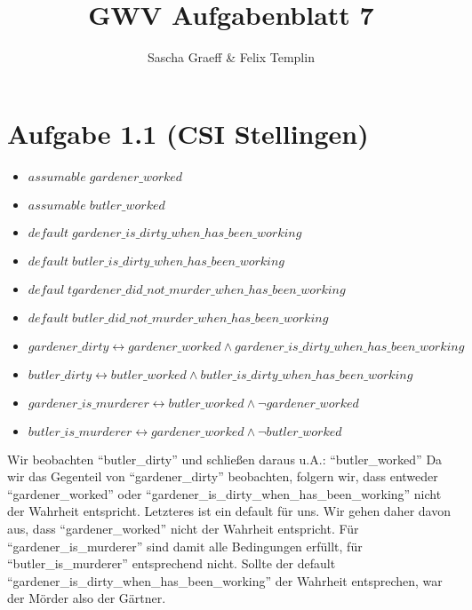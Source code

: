 \documentclass[a4paper,10pt]{article}
\title{GWV Aufgabenblatt 7}
\author{Sascha Graeff \& Felix Templin}
\begin{document}
\maketitle

\section*{Aufgabe 1.1 (CSI Stellingen)}
\begin{itemize}
  \item $assumable \; gardener\_worked$
  \item $assumable \; butler\_worked$
  \item $default \; gardener\_is\_dirty\_when\_has\_been\_working$
  \item $default \; butler\_is\_dirty\_when\_has\_been\_working$
  \item $defaul \;t gardener\_did\_not\_murder\_when\_has\_been\_working$
  \item $default \; butler\_did\_not\_murder\_when\_has\_been\_working$
  \item $gardener\_dirty \leftrightarrow gardener\_worked \wedge gardener\_is\_dirty\_when\_has\_been\_working$
  \item $butler\_dirty \leftrightarrow butler\_worked \wedge butler\_is\_dirty\_when\_has\_been\_working$
  \item $gardener\_is\_murderer \leftrightarrow butler\_worked \wedge \neg gardener\_worked$
  \item $butler\_is\_murderer \leftrightarrow gardener\_worked \wedge \neg butler\_worked$
\end{itemize}
Wir beobachten ``butler\_dirty'' und schließen daraus u.A.: ``butler\_worked''
Da wir das Gegenteil von ``gardener\_dirty'' beobachten, folgern wir, dass entweder ``gardener\_worked'' oder ``gardener\_is\_dirty\_when\_has\_been\_working'' nicht der Wahrheit entspricht. Letzteres ist ein default für uns.
Wir gehen daher davon aus, dass ``gardener\_worked'' nicht der Wahrheit entspricht.
Für ``gardener\_is\_murderer'' sind damit alle Bedingungen erfüllt, für ``butler\_is\_murderer'' entsprechend nicht.
Sollte der default ``gardener\_is\_dirty\_when\_has\_been\_working'' der Wahrheit entsprechen, war der Mörder also der Gärtner.
\end{document}
